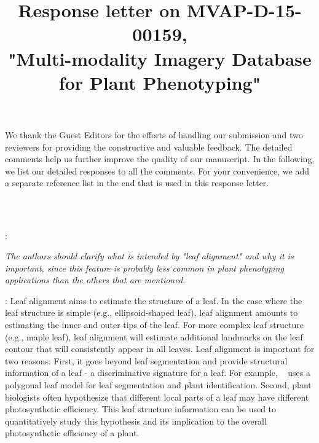 \documentclass[11pt,letterpaper]{article}
\title{Response letter on MVAP-D-15-00159, \\"Multi-modality Imagery Database for Plant Phenotyping"}
\newcounter{reviewcounter}
\newenvironment{review}
{\noindent {\bf Comment~\arabic{reviewcounter}}:\addtocounter{reviewcounter}{1}\itshape}
{\vspace{0.8em}}
\newenvironment{response}
{\noindent {\bf Response}: \color{black}}
{\color{black} \vspace{1.6em}}
\begin{document}
\maketitle

{%
We thank the Guest Editors for the efforts of handling our submission and two reviewers for providing the constructive and valuable feedback.
The detailed comments help us further improve the quality of our manuscript.
In the following, we list our detailed responses to all the comments.
For your convenience, we add a separate reference list in the end that is used in this response letter.
}


\vspace{2em}
\\
\begin{tabular*}{\textwidth}{c}
\hline
\end{tabular*}

\begin{review}
The authors should clarify what is intended by "leaf alignment" and why it is important, since this feature is probably less common in plant phenotyping applications than the others that are mentioned.
\end{review}

\begin{response}
Leaf alignment aims to estimate the structure of a leaf. 
In the case where the leaf structure is simple (e.g., ellipsoid-shaped leaf), leaf alignment amounts to estimating the inner and outer tips of the leaf.
For more complex leaf structure (e.g., maple leaf), leaf alignment will estimate additional landmarks on the leaf contour that will consistently appear in all leaves.
Leaf alignment is important for two reasons:
First, it goes beyond leaf segmentation and provide structural information of a leaf - a discriminative signature for a leaf.
For example, ~\cite{cerutti2013understanding} uses a polygonal leaf model for leaf segmentation and plant identification.
Second, plant biologists often hypothesize that different local parts of a leaf may have different photosynthetic efficiency.
This leaf structure information can be used to quantitatively study this hypothesis and its implication to the overall photosynthetic efficiency of a plant.
\end{response}
\end{document}
